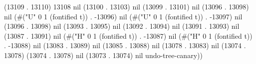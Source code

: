 (13109 . 13110) 13108 nil (13100 . 13103) nil (13099 . 13101) nil (13096 . 13098) nil (#("U" 0 1 (fontified t)) . -13096) nil (#("U" 0 1 (fontified t)) . -13097) nil (13096 . 13098) nil (13093 . 13095) nil (13092 . 13094) nil (13091 . 13093) nil (13087 . 13091) nil (#("H" 0 1 (fontified t)) . -13087) nil (#("H" 0 1 (fontified t)) . -13088) nil (13083 . 13089) nil (13085 . 13088) nil (13078 . 13083) nil (13074 . 13078) (13074 . 13078) nil (13073 . 13074) nil undo-tree-canary))
